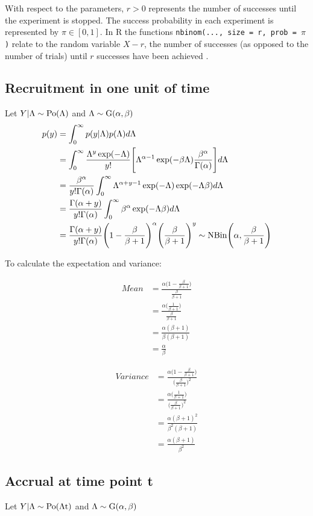 With respect to the parameters, $r>0$ represents the number of successes until 
the experiment is stopped. The success probability in each experiment is 
represented by $\pi\in[0,1]$.  In R the functions \texttt{nbinom(..., size = r, prob = $\pi$)} relate to the random variable $X-r$, the number of successes (as opposed to the number of trials) until $r$ successes have been achieved \citep{held2014applied}. 


\subsection{Recruitment in one unit of time}
Let $Y|\Lambda \sim \rm{Po}(\Lambda)$ and $\Lambda \sim \rm{G}(\alpha,\beta)$
\begin{align*}
p(y)&=\int^\infty_0 p(y|\Lambda) p(\Lambda) d\Lambda\\
&=\int^\infty_0 \frac{\Lambda^y\exp(-\Lambda)}{y!}\Bigg[\Lambda^{\alpha-1}\exp(-\beta\Lambda)\frac{\beta^\alpha}{\Gamma(\alpha)}\Bigg]d\Lambda\\
&=\frac{\beta^\alpha}{y!\Gamma(\alpha)}\int^\infty_0 \Lambda^{\alpha+y-1}\exp(-\Lambda)\exp(-\Lambda\beta)d\Lambda\\
&=\frac{\Gamma(\alpha+y)}{y!\Gamma(\alpha)}\int^\infty_0 \beta^\alpha \exp(-\Lambda\beta)d\Lambda\\
&=\frac{\Gamma(\alpha+y)}{y!\Gamma(\alpha)}\Bigg(1-\frac{\beta}{\beta+1}\Bigg)^{\alpha}\Bigg(\frac{\beta}{\beta+1}\Bigg)^y \sim \rm{NBin} \Bigg(\alpha, \frac{\beta}{\beta+1}\Bigg)
\end{align*}

To calculate the expectation and variance:

\begin{align*}
Mean &= \frac{\alpha\bigg(1-\frac{\beta}{\beta+1}\bigg)}{\frac{\beta}{\beta+1}}\\
&= \frac{\alpha\bigg (\frac{1}{\beta+1}\bigg)}{\frac{\beta}{\beta+1}}\\
&= \frac{\alpha(\beta+1)}{\beta(\beta+1)}\\
&= \frac{\alpha}{\beta}
\end{align*}

\begin{align*}
Variance &= \frac{\alpha\bigg(1-\frac{\beta}{\beta+1}\bigg)}{\bigg(\frac{\beta}{\beta+1}\bigg)^2}\\
&= \frac{\alpha\bigg (\frac{1}{\beta+1}\bigg)}{\bigg(\frac{\beta}{\beta+1}\bigg)^2}\\
&= \frac{\alpha(\beta+1)^2}{\beta^2(\beta+1)}\\
&= \frac{\alpha(\beta+1)}{\beta^2}
\end{align*}


\subsection{Accrual at time point t}
Let $Y|\Lambda \sim \rm{Po}(\Lambda t)$ and $\Lambda \sim \rm{G}(\alpha,\beta)$









